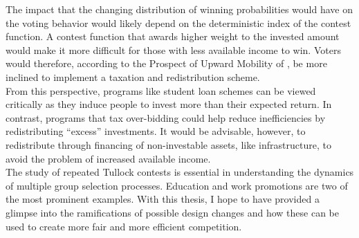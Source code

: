 The impact that the changing distribution of winning probabilities would have on the voting behavior would likely depend on the deterministic index of the contest function. A contest function that awards higher weight to the invested amount would make it more difficult for those with less available income to win. Voters would therefore, according to the Prospect of Upward Mobility of \cite{benabou2001}, be more inclined to implement a taxation and redistribution scheme.\\

From this perspective, programs like student loan schemes can be viewed critically as they induce people to invest more than their expected return. In contrast, programs that tax over-bidding could help reduce inefficiencies by redistributing ``excess'' investments. It would be advisable, however, to redistribute through financing of non-investable assets, like infrastructure, to avoid the problem of increased available income.\\

The study of repeated Tullock contests is essential in understanding the dynamics of multiple group selection processes. Education and work promotions are two of the most prominent examples. With this thesis, I hope to have provided a glimpse into the ramifications of possible design changes and how these can be used to create more fair and more efficient competition.